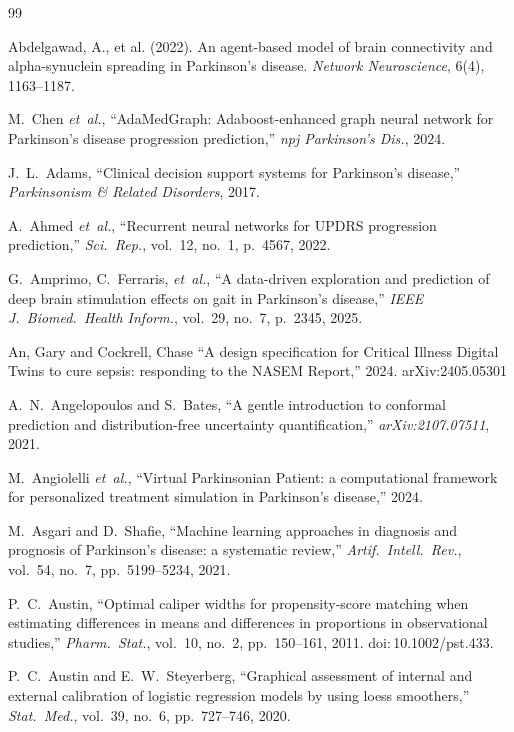 \begin{thebibliography}{99}

Abdelgawad, A., et al. (2022).
\newblock An agent-based model of brain connectivity and alpha-synuclein spreading in Parkinson's disease.
\newblock \emph{Network Neuroscience}, 6(4), 1163--1187.

M.~Chen \textit{et~al.}, ``AdaMedGraph: Adaboost-enhanced graph neural network for Parkinson's disease progression prediction,'' \textit{npj Parkinson's Dis.}, 2024.

J.~L.~Adams, ``Clinical decision support systems for Parkinson's disease,'' \textit{Parkinsonism \& Related Disorders}, 2017.

A.~Ahmed \textit{et~al.}, ``Recurrent neural networks for UPDRS progression prediction,'' \textit{Sci.\ Rep.}, vol.~12, no.~1, p.~4567, 2022.

G.~Amprimo, C.~Ferraris, \textit{et~al.}, ``A data-driven exploration and prediction of deep brain stimulation effects on gait in Parkinson's disease,'' \textit{IEEE J.\ Biomed.\ Health Inform.}, vol.~29, no.~7, p.~2345, 2025.

 An, Gary and Cockrell, Chase ``A design specification for Critical Illness Digital Twins to cure sepsis: responding to the NASEM Report,'' 2024. arXiv:2405.05301

A.~N.~Angelopoulos and S.~Bates, ``A gentle introduction to conformal prediction and distribution-free uncertainty quantification,'' \textit{arXiv:2107.07511}, 2021.

M.~Angiolelli \textit{et~al.}, ``Virtual Parkinsonian Patient: a
computational framework for personalized treatment simulation in
Parkinson's disease,'' 2024.

M.~Asgari and D.~Shafie, ``Machine learning approaches in diagnosis and prognosis of Parkinson's disease: a systematic review,'' \textit{Artif.\ Intell.\ Rev.}, vol.~54, no.~7, pp.~5199--5234, 2021.

P.~C.~Austin, ``Optimal caliper widths for propensity-score matching when estimating differences in means and differences in proportions in observational studies,'' \textit{Pharm.\ Stat.}, vol.~10, no.~2, pp.~150--161, 2011. doi:\,10.1002/pst.433.

P.~C.~Austin and E.~W.~Steyerberg, ``Graphical assessment of internal and external calibration of logistic regression models by using loess smoothers,'' \textit{Stat.\ Med.}, vol.~39, no.~6, pp.~727--746, 2020.


\end{thebibliography}
